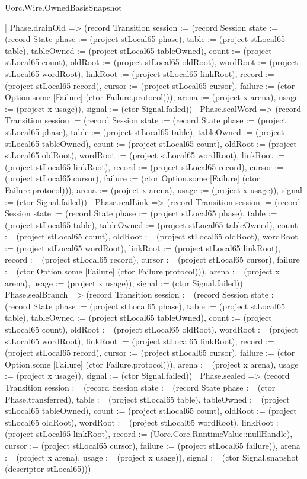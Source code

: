 \begin{lexlean}{Uorc.Wire.OwnedBasisSnapshot}
\begin{semanticmodule}
{      | Phase.drainOld => (record Transition {session := (record Session {state := (record State {phase := (project stLocal65 phase), table := (project stLocal65 table), tableOwned := (project stLocal65 tableOwned), count := (project stLocal65 count), oldRoot := (project stLocal65 oldRoot), wordRoot := (project stLocal65 wordRoot), linkRoot := (project stLocal65 linkRoot), record := (project stLocal65 record), cursor := (project stLocal65 cursor), failure := (ctor Option.some [Failure] (ctor Failure.protocol))}), arena := (project x arena), usage := (project x usage)}), signal := (ctor Signal.failed)})
      | Phase.sealWord => (record Transition {session := (record Session {state := (record State {phase := (project stLocal65 phase), table := (project stLocal65 table), tableOwned := (project stLocal65 tableOwned), count := (project stLocal65 count), oldRoot := (project stLocal65 oldRoot), wordRoot := (project stLocal65 wordRoot), linkRoot := (project stLocal65 linkRoot), record := (project stLocal65 record), cursor := (project stLocal65 cursor), failure := (ctor Option.some [Failure] (ctor Failure.protocol))}), arena := (project x arena), usage := (project x usage)}), signal := (ctor Signal.failed)})
      | Phase.sealLink => (record Transition {session := (record Session {state := (record State {phase := (project stLocal65 phase), table := (project stLocal65 table), tableOwned := (project stLocal65 tableOwned), count := (project stLocal65 count), oldRoot := (project stLocal65 oldRoot), wordRoot := (project stLocal65 wordRoot), linkRoot := (project stLocal65 linkRoot), record := (project stLocal65 record), cursor := (project stLocal65 cursor), failure := (ctor Option.some [Failure] (ctor Failure.protocol))}), arena := (project x arena), usage := (project x usage)}), signal := (ctor Signal.failed)})
      | Phase.sealBranch => (record Transition {session := (record Session {state := (record State {phase := (project stLocal65 phase), table := (project stLocal65 table), tableOwned := (project stLocal65 tableOwned), count := (project stLocal65 count), oldRoot := (project stLocal65 oldRoot), wordRoot := (project stLocal65 wordRoot), linkRoot := (project stLocal65 linkRoot), record := (project stLocal65 record), cursor := (project stLocal65 cursor), failure := (ctor Option.some [Failure] (ctor Failure.protocol))}), arena := (project x arena), usage := (project x usage)}), signal := (ctor Signal.failed)})
      | Phase.sealed => (record Transition {session := (record Session {state := (record State {phase := (ctor Phase.transferred), table := (project stLocal65 table), tableOwned := (project stLocal65 tableOwned), count := (project stLocal65 count), oldRoot := (project stLocal65 oldRoot), wordRoot := (project stLocal65 wordRoot), linkRoot := (project stLocal65 linkRoot), record := (Uorc.Core.RuntimeValue::nullHandle), cursor := (project stLocal65 cursor), failure := (project stLocal65 failure)}), arena := (project x arena), usage := (project x usage)}), signal := (ctor Signal.snapshot (descriptor stLocal65))})
}
\end{semanticmodule}
\end{lexlean}
